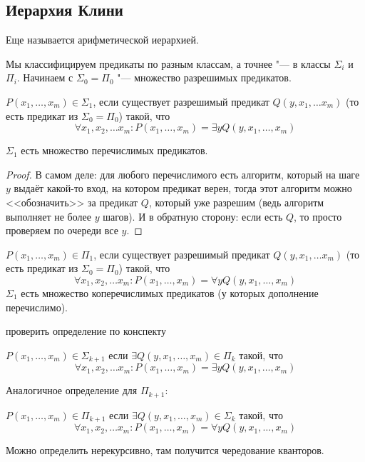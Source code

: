 \subsection{Иерархия Клини}
Еще называется арифметической иерархией.

Мы классифицируем предикаты по разным классам, а точнее "--- в классы $\Sigma_i$ и $\Pi_i$.
Начинаем с $\Sigma_0=\Pi_0$ "--- множество разрешимых предикатов.
\begin{Def}
	$P(x_1, \dots, x_m) \in \Sigma_1$, если существует разрешимый предикат $Q(y, x_1, \dots x_m)$
	(то есть предикат из $\Sigma_0 = \Pi_0$) такой, что
	\[
	\forall x_1, x_2, \dots x_m \colon P(x_1, \dots, x_m) = \exists y Q(y, x_1, \dots, x_m)
	\]
\end{Def}
\begin{Rem}
	$\Sigma_1$ есть множество перечислимых предикатов.
\end{Rem}
\begin{proof}
	В самом деле: для любого перечислимого есть алгоритм, который на шаге $y$ выдаёт какой-то
	вход, на котором предикат верен, тогда этот алгоритм можно <<обозначить>> за предикат $Q$,
	который уже разрешим (ведь алгоритм выполняет не более $y$ шагов).
	И в обратную сторону: если есть $Q$, то просто проверяем по очереди все $y$.
\end{proof}

\begin{Def}
  $P(x_1, \dots, x_m) \in \Pi_1$, если существует разрешимый предикат $Q(y, x_1, \dots x_m)$
  (то есть предикат из $\Sigma_0 = \Pi_0$) такой, что
  \[
  \forall x_1, x_2, \dots x_m \colon P(x_1, \dots, x_m) = \forall y Q(y, x_1, \dots, x_m)
  \]
  $\Sigma_1$ есть множество коперечислимых предикатов (у которых дополнение перечислимо).
\end{Def}

\TODO проверить определение по конспекту
\begin{Def}
	$P(x_1, \dots, x_m) \in \Sigma_{k+1}$ если $\exists Q(y, x_1, \dots, x_m) \in \Pi_k$ такой,
	что
	\[
	\forall x_1, x_2, \dots x_m \colon P(x_1, \dots, x_m) = \exists y Q(y, x_1, \dots, x_m)
	\]
\end{Def}
Аналогичное определение для $\Pi_{k+1}$:
\begin{Def}
	$P(x_1, \dots, x_m) \in \Pi_{k+1}$ если $\exists Q(y, x_1, \dots, x_m) \in \Sigma_k$ такой,
	что
	\[
	\forall x_1, x_2, \dots x_m \colon P(x_1, \dots, x_m) = \forall y Q(y, x_1, \dots, x_m)
	\]
\end{Def}
Можно определить нерекурсивно, там получится чередование кванторов.

